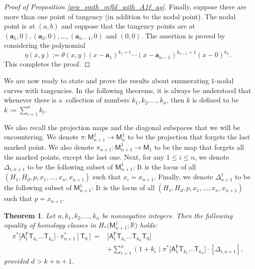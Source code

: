 \documentclass[pdftex]{sigma}
\numberwithin{equation}{section}
\newtheorem{thm}{Theorem}[section]
\begin{document}
\begin{proof}[Proof of Proposition \ref{prp_smth_mfld_with_A1f_ag}]
Finally, suppose there are more than one point of tangency (in addition to the nodal point).
The nodal point is at $(a,b)$ and suppose that the tangency points are at
$(\mathbf{a}_1, 0), (\mathbf{a}_2, 0), \dots,\allowbreak (\mathbf{a}_{n-1}, 0)$
and $(0,0)$. The assertion is proved by considering the polynomial
\[ \eta(x,y) := \theta(x,y)(x-\mathbf{a}_1)^{k_1+1} \cdots (x-\mathbf{a}_{n-1})^{k_{n-1}+1} (x-0)^{k_n}. \]
This completes the proof.
 \end{proof}

We are now ready to state and prove the results about enumerating $1$-nodal curves with tangencies.
In the following theorems, it is always be understood that whenever there is a~collection of
numbers $k_1, k_2, \dots, k_n$, then $k$ is defined to be
$k := \sum_{i=1}^n k_i$.

We also recall the projection maps and the diagonal
subspaces that we will be encountering. We denote
$\pi \colon \mathsf{M}^1_{n+1} \longrightarrow \mathsf{M}^1_n$
to be
the projection that forgets the last marked point.
We also denote
$\pi_{n+1} \colon \mathsf{M}^1_{n+1} \longrightarrow \mathsf{M}_1$
to be the map that forgets all the marked points, except the last one.
Next, for any $1 \leq i \leq n$, we denote
$\Delta_{i, n+1}$ to be the following subset of
$\mathsf{M}_{n+1}^1$:
It is the locus of all $(H_1, H_d, p, x_1, \dots, x_{n}, x_{n+1})$
such that $x_i = x_{n+1}$.
Finally, we denote
$\Delta_{n+1}^{1}$
to be the following subset of
$\mathsf{M}_{n+1}^1$:
It is the locus of all $(H_1, H_d, p, x_1, \dots, x_{n}, x_{n+1})$
such that $p = x_{n+1}$.



\begin{thm}\label{theorem_for_many_Tks_A1F}
Let
$n, k_1, k_2, \dots , k_n$ be nonnegative integers.
Then the following equality of homology classes in $H_*\bigl(\mathsf{M}_{{n+1}}^1; \mathbb{R}\bigr)$ holds:
\begin{align}
\pi^{\ast} \bigl[\mathsf{A}_1^{\mathsf{F}} \mathsf{T}_{k_1} \dots \mathsf{T}_{k_n}\bigr]\cdot
\pi_{n+1}^{\ast}[\mathsf{T}_0]  ={}&
\bigl[\mathsf{A}_1^{\mathsf{F}} \mathsf{T}_{k_1}\dots \mathsf{T}_{k_n} \mathsf{T}_{0}\bigr]\nonumber\\
&+ \sum_{i=1}^{n}(1+k_i) \pi^{\ast} \bigl[\mathsf{A}_1^{\mathsf{F}}
\mathsf{T}_{k_1}\dots \mathsf{T}_{k_n}\bigr] \cdot [\Delta_{i, {n+1}}],\label{many_Tks_A1F}
\end{align}
provided $d > k+n+1$.
\end{thm}
\end{document}
